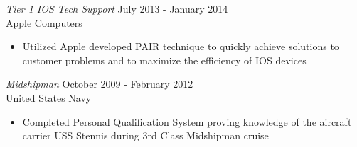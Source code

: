 \documentclass[margin]{res}
\begin{document}
\begin{resume}
  {\sl Tier 1 IOS Tech Support} \hfill July 2013 - January 2014 \\
  Apple Computers 
  \begin{itemize}  \itemsep -2pt %
    \item Utilized Apple developed PAIR technique to quickly achieve solutions to customer problems and to maximize the efficiency of IOS devices
  \end{itemize}

  {\sl Midshipman} \hfill October 2009 - February 2012 \\
  United States Navy
  \begin{itemize}  \itemsep -2pt %
    \item Completed Personal Qualification System proving knowledge of the aircraft carrier USS Stennis during 3rd Class Midshipman cruise
  \end{itemize}

\end{resume}
\end{document}
